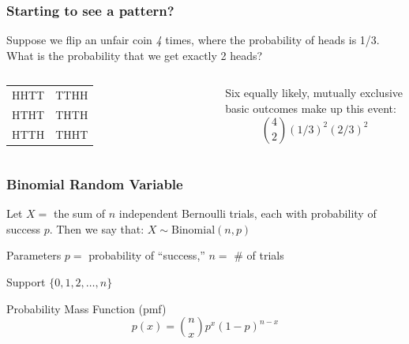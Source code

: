\documentclass[handout]{beamer}
\begin{document}
\begin{frame}
\frametitle{Starting to see a pattern?}

Suppose we flip an unfair coin \emph{4} times, where the probability of heads is 1/3. What is the probability that we get exactly 2 heads?

\vspace{2em}



\begin{columns}
\begin{tabular}{cc}
HHTT&TTHH\\
HTHT&THTH\\
HTTH&THHT
\end{tabular}

\alert{Six equally likely, mutually exclusive basic outcomes make up this event:}
$${4\choose 2}(1/3)^2(2/3)^2$$
\end{columns}

\end{frame}


\begin{frame}
\frametitle{Binomial Random Variable}
Let $X = $ the sum of $n$ independent Bernoulli trials, each with probability of success $p$.  \alert{Then we say that:
		$X \sim \mbox{Binomial}(n,p)$} 

\vspace{2em}
\begin{block}{Parameters}
$p =$ probability of ``success,'' $n=$ \# of trials
\end{block}
\begin{block}{Support} 
$\{0, 1, 2, \hdots, n\}$ 
\end{block}
\begin{block}{Probability Mass Function (pmf)} 
$$p(x) = {n \choose x} p^x (1-p)^{n-x}$$ 
\end{block}
\end{frame}
\end{document}

